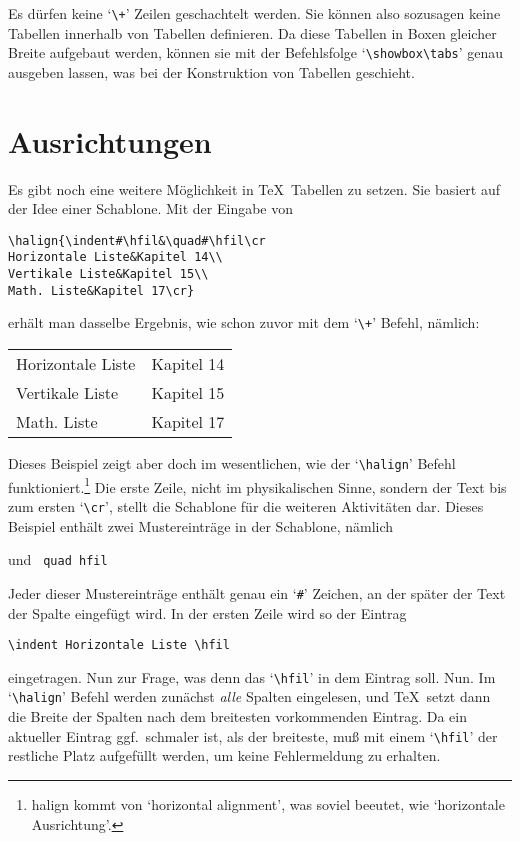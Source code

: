 Es d\"urfen keine `\verb|\+|' Zeilen geschachtelt werden. Sie k\"onnen
also sozusagen keine Tabellen innerhalb von Tabellen definieren. Da
diese Tabellen in 
Boxen gleicher Breite aufgebaut werden, k\"onnen sie
mit der Befehlsfolge 
`\verb|\showbox\tabs|' genau ausgeben lassen, was
bei der Konstruktion von Tabellen geschieht.

\section{Ausrichtungen}
Es gibt noch eine weitere M\"oglichkeit in \TeX\ Tabellen zu setzen. Sie
basiert auf der Idee einer  Schablone. Mit der Eingabe
von
\begin{verbatim}
\halign{\indent#\hfil&\quad#\hfil\cr
Horizontale Liste&Kapitel 14\\
Vertikale Liste&Kapitel 15\\
Math. Liste&Kapitel 17\cr}
\end{verbatim}
erh\"alt man dasselbe Ergebnis, wie schon zuvor mit dem `\verb|\+|'
Befehl, n\"amlich:

\medskip\begin{tabular}{ll}
Horizontale Liste&Kapitel 14\\
Vertikale Liste&Kapitel 15\\
Math. Liste&Kapitel 17
\end{tabular}\medskip

Dieses Beispiel zeigt aber doch im wesentlichen, wie der
`\verb|\halign|' Befehl funktioniert.\footnote{halign kommt von
`horizontal alignment', was soviel beeutet, wie
`horizontale
Ausrichtung'.} Die erste Zeile, nicht im physikalischen Sinne, sondern
der Text bis zum ersten `\verb|\cr|', stellt die 
Schablone f\"ur die
weiteren Aktivit\"aten dar. Dieses Beispiel enth\"alt zwei
Mustereintr\"age
in der Schablone, n\"amlich

 und {\tt{}
quad hfil}\medskip

Jeder dieser Mustereintr\"age enth\"alt genau ein `\verb|#|' Zeichen, an
der sp\"ater der Text der Spalte eingef\"ugt wird. In der ersten Zeile
wird so der Eintrag
\begin{verbatim}
\indent Horizontale Liste \hfil
\end{verbatim}
eingetragen. Nun zur Frage, was denn das `\verb|\hfil|' in dem Eintrag
soll. Nun. Im 
`\verb|\halign|' Befehl werden zun\"achst {\em alle}
Spalten eingelesen, und \TeX\ setzt dann die Breite der Spalten nach
dem breitesten vorkommenden Eintrag. Da ein aktueller Eintrag ggf.\
schmaler ist, als der breiteste, mu\ss{} mit einem `\verb|\hfil|' der
restliche Platz aufgef\"ullt werden, um keine \index{Fehler!Meldung}
Fehlermeldung zu erhalten.

